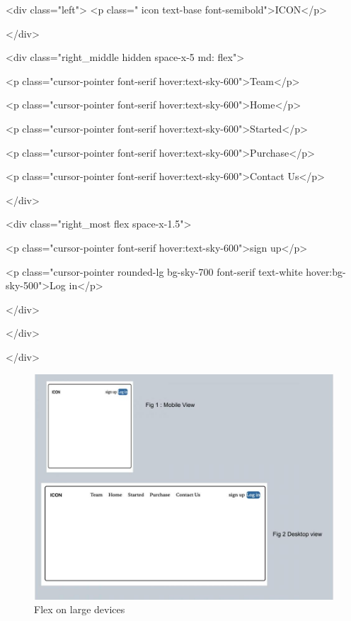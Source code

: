 \documentclass[conference]{IEEEtran}
\begin{document}
\textless div class="left"\textgreater{}
\textless p class=" icon text-base
font-semibold"\textgreater ICON\textless/p\textgreater{}

\textless/div\textgreater{}

\textless div class="right\_middle hidden space-x-5
md: flex"\textgreater{}

\textless p class="cursor-pointer font-serif
hover:text-sky-600"\textgreater Team\textless/p\textgreater{}

\textless p class="cursor-pointer font-serif
hover:text-sky-600"\textgreater Home\textless/p\textgreater{}

\textless p class="cursor-pointer font-serif
hover:text-sky-600"\textgreater Started\textless/p\textgreater{}

\textless p class="cursor-pointer font-serif
hover:text-sky-600"\textgreater Purchase\textless/p\textgreater{}

\textless p class="cursor-pointer font-serif
hover:text-sky-600"\textgreater Contact Us\textless/p\textgreater{}

\textless/div\textgreater{}

\textless div class="right\_most flex space-x-1.5"\textgreater{}

\textless p class="cursor-pointer font-serif
hover:text-sky-600"\textgreater sign up\textless/p\textgreater{}

\textless p class="cursor-pointer rounded-lg bg-sky-700 font-serif
text-white hover:bg-sky-500"\textgreater Log in\textless/p\textgreater{}

\textless/div\textgreater{}

\textless/div\textgreater{}

\textless/div\textgreater{}

\begin{figure}
    \centering
    \includegraphics[width=1\linewidth]{Flex_on_large.jpg}
    \caption{Flex on large devices}
    \label{fig:enter-label}
\end{figure}
\end{document}
